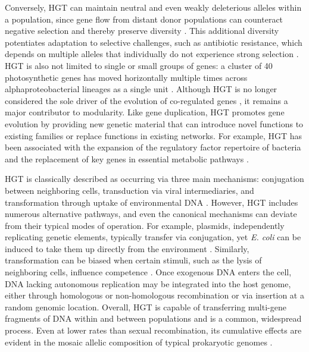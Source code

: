 Conversely, HGT can maintain neutral and even weakly deleterious alleles within a population, since gene flow from distant donor populations can counteract negative selection and thereby preserve diversity \citep{woods2020horizontal}.
This additional diversity potentiates adaptation to selective challenges, such as antibiotic resistance, which depends on multiple alleles that individually do not experience strong selection \citep{woods2020horizontal}.
HGT is also not limited to single or small groups of genes: a cluster of 40 photosynthetic genes has moved horizontally multiple times across alphaproteobacterial lineages as a single unit \citep{martin2018physiological, brinkmann2018horizontal}.
Although HGT is no longer considered the sole driver of the evolution of co-regulated genes \citep{lawrence1996selfish, omelchenko2003evolution, price2005operon}, it remains a major contributor to modularity.
Like gene duplication, HGT promotes gene evolution by providing new genetic material that can introduce novel functions to existing families or replace functions in existing networks.
For example, HGT has been associated with the expansion of the regulatory factor repertoire of bacteria \citep{price2008horizontal} and the replacement of key genes in essential metabolic pathways \citep{goyal2022horizontal}.

HGT is classically described as occurring via three main mechanisms: conjugation between neighboring cells, transduction via viral intermediaries, and transformation through uptake of environmental DNA \citep{arnold2022horizontal}.
However, HGT includes numerous alternative pathways, and even the canonical mechanisms can deviate from their typical modes of operation.
For example, plasmids, independently replicating genetic elements, typically transfer via conjugation, yet \textit{E. coli} can be induced to take them up directly from the environment \citep{hasegawa2018horizontal}.
Similarly, transformation can be biased when certain stimuli, such as the lysis of neighboring cells, influence competence \citep{wall2016kin}.
Once exogenous DNA enters the cell, DNA lacking autonomous replication may be integrated into the host genome, either through homologous or non-homologous recombination or via insertion at a random genomic location.
Overall, HGT is capable of transferring multi-gene fragments of DNA within and between populations and is a common, widespread process.
Even at lower rates than sexual recombination, its cumulative effects are evident in the mosaic allelic composition of typical prokaryotic genomes \citep{arnold2022horizontal}.

